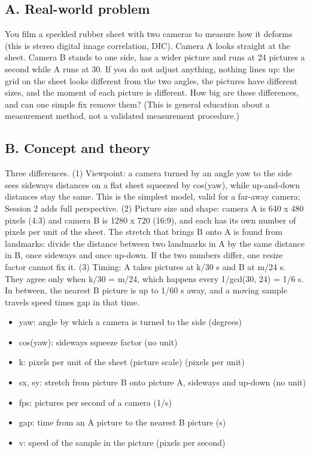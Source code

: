 \documentclass[11pt,a4paper]{article}
\begin{document}
\subsection*{A. Real-world problem}
You film a speckled rubber sheet with two cameras to measure how it deforms (this is stereo digital image correlation, DIC). Camera A looks straight at the sheet. Camera B stands to one side, has a wider picture and runs at 24 pictures a second while A runs at 30. If you do not adjust anything, nothing lines up: the grid on the sheet looks different from the two angles, the pictures have different sizes, and the moment of each picture is different. How big are these differences, and can one simple fix remove them? (This is general education about a measurement method, not a validated measurement procedure.)

\subsection*{B. Concept and theory}
Three differences. (1) Viewpoint: a camera turned by an angle yaw to the side sees sideways distances on a flat sheet squeezed by cos(yaw), while up-and-down distances stay the same. This is the simplest model, valid for a far-away camera; Session 2 adds full perspective. (2) Picture size and shape: camera A is 640 x 480 pixels (4:3) and camera B is 1280 x 720 (16:9), and each has its own number of pixels per unit of the sheet. The stretch that brings B onto A is found from landmarks: divide the distance between two landmarks in A by the same distance in B, once sideways and once up-down. If the two numbers differ, one resize factor cannot fix it. (3) Timing: A takes pictures at k/30 s and B at m/24 s. They agree only when k/30 = m/24, which happens every 1/gcd(30, 24) = 1/6 s. In between, the nearest B picture is up to 1/60 s away, and a moving sample travels speed times gap in that time.

\begin{itemize}[nosep]
\item yaw: angle by which a camera is turned to the side (degrees)
\item cos(yaw): sideways squeeze factor (no unit)
\item k: pixels per unit of the sheet (picture scale) (pixels per unit)
\item sx, sy: stretch from picture B onto picture A, sideways and up-down (no unit)
\item fps: pictures per second of a camera (1/s)
\item gap: time from an A picture to the nearest B picture (s)
\item v: speed of the sample in the picture (pixels per second)
\end{itemize}
\end{document}
